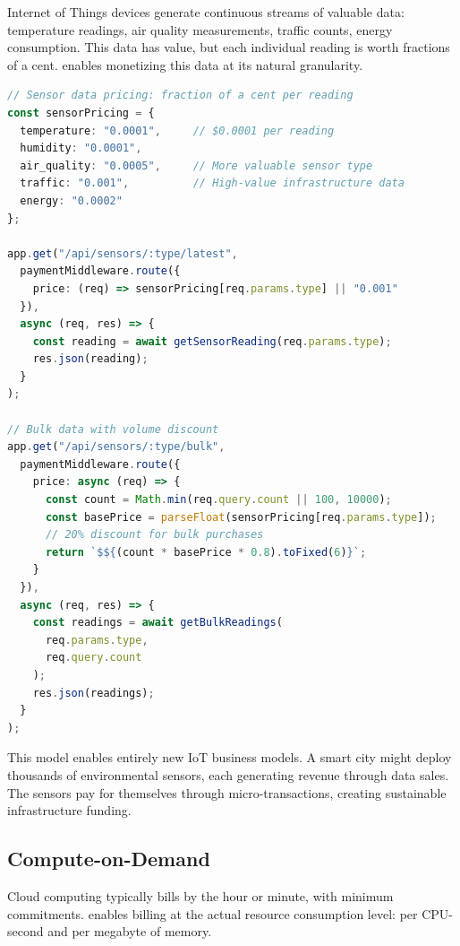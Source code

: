 Internet of Things devices generate continuous streams of valuable data: temperature readings, air quality measurements, traffic counts, energy consumption. This data has value, but each individual reading is worth fractions of a cent. \tprotocol{} enables monetizing this data at its natural granularity.

\begin{lstlisting}[language=typescript,caption={IoT sensor data marketplace with granular pricing}]
// Sensor data pricing: fraction of a cent per reading
const sensorPricing = {
  temperature: "0.0001",     // $0.0001 per reading
  humidity: "0.0001",
  air_quality: "0.0005",     // More valuable sensor type
  traffic: "0.001",          // High-value infrastructure data
  energy: "0.0002"
};

app.get("/api/sensors/:type/latest",
  paymentMiddleware.route({
    price: (req) => sensorPricing[req.params.type] || "0.001"
  }),
  async (req, res) => {
    const reading = await getSensorReading(req.params.type);
    res.json(reading);
  }
);

// Bulk data with volume discount
app.get("/api/sensors/:type/bulk",
  paymentMiddleware.route({
    price: async (req) => {
      const count = Math.min(req.query.count || 100, 10000);
      const basePrice = parseFloat(sensorPricing[req.params.type]);
      // 20% discount for bulk purchases
      return `$${(count * basePrice * 0.8).toFixed(6)}`;
    }
  }),
  async (req, res) => {
    const readings = await getBulkReadings(
      req.params.type,
      req.query.count
    );
    res.json(readings);
  }
);
\end{lstlisting}

This model enables entirely new IoT business models. A smart city might deploy thousands of environmental sensors, each generating revenue through data sales. The sensors pay for themselves through micro-transactions, creating sustainable infrastructure funding.

\subsection{Compute-on-Demand}

Cloud computing typically bills by the hour or minute, with minimum commitments. \tprotocol{} enables billing at the actual resource consumption level: per CPU-second and per megabyte of memory.

